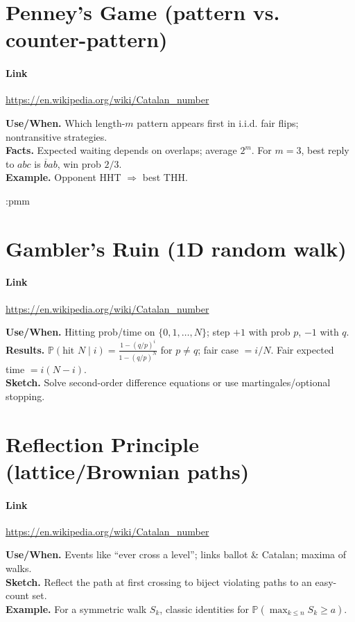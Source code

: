 \documentclass[11pt,A4,twoside]{article}
\let\oldsection\section
\renewcommand{\section}{\FloatBarrier\oldsection}
\numberwithin{equation}{section}
\theoremstyle{definition}
\theoremstyle{remark}
\newcommand{\Prob}{\mathbb{P}}
\begin{document}
\section{Penney’s Game (pattern vs. counter-pattern)}
\paragraph{Link} \url{https://en.wikipedia.org/wiki/Catalan_number}

\textbf{Use/When.} Which length-\(m\) pattern appears first in i.i.d. fair flips; nontransitive strategies.\\
\textbf{Facts.} Expected waiting depends on overlaps; average \(2^m\). For \(m=3\), best reply to \(abc\) is \(\overline{b}ab\), win prob \(2/3\).\\
\textbf{Example.} Opponent HHT \(\Rightarrow\) best THH.

:pmm\section{Gambler’s Ruin (1D random walk)}
\paragraph{Link} \url{https://en.wikipedia.org/wiki/Catalan_number}

\textbf{Use/When.} Hitting prob/time on \(\{0,1,\dots,N\}\); step \(+1\) with prob \(p\), \(-1\) with \(q\).\\
\textbf{Results.} \(\Prob(\text{hit }N\mid i)=\frac{1-(q/p)^i}{1-(q/p)^N}\) for \(p\neq q\); fair case \(=i/N\). Fair expected time \(=i(N-i)\).\\
\textbf{Sketch.} Solve second-order difference equations or use martingales/optional stopping.

\section{Reflection Principle (lattice/Brownian paths)}
\paragraph{Link} \url{https://en.wikipedia.org/wiki/Catalan_number}

\textbf{Use/When.} Events like “ever cross a level”; links ballot \& Catalan; maxima of walks.\\
\textbf{Sketch.} Reflect the path at first crossing to biject violating paths to an easy-count set.\\
\textbf{Example.} For a symmetric walk \(S_k\), classic identities for \(\Prob(\max_{k\le n} S_k\ge a)\).
\end{document}
